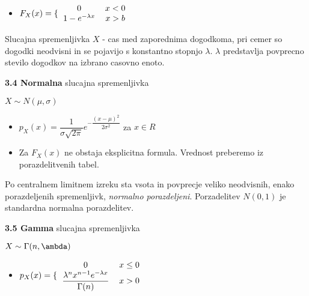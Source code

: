 \documentclass{article}
\begin{document}
\begin{multicols}{3}
\begin{itemize}
		\item \begin{math}
			      F_{X}(x) =
			      \{\begin{tabular}{ccc}
				      $0$                   & $x < 0$ & \\
				      $1 - e^{- \lambda x}$ & $x > b$ & \\
			      \end{tabular}
		      \end{math}
	\end{itemize}

	Slucajna spremenljivka $X$ - cas med zaporednima dogodkoma,
	pri cemer so dogodki neodvisni in se pojavijo s konstantno
	stopnjo $\lambda$. $\lambda$ predstavlja povprecno stevilo dogodkov
	na izbrano casovno enoto.

	\textbf{3.4 Normalna} slucajna spremenljivka
	\begin{center}
		\begin{math}
			X \sim N(\mu, \sigma )
		\end{math}
	\end{center}

	\begin{itemize}
		\item  \begin{math}
			      p_{X}(x) = \dfrac{1}{\sigma \sqrt{2 \pi}} e^{- \dfrac{(x - \mu)^{2}}{2 \sigma^{2}}}
		      \end{math} za $x \in R$

		\item Za $F_{X}(x)$ ne obstaja eksplicitna formula. Vrednost preberemo iz porazdelitvenih tabel.
	\end{itemize}
	Po centralnem limitnem izreku sta vsota in povprecje veliko neodvisnih, enako porazdeljenih
	spremenljivk, \textit{normalno porazdeljeni}.
	Porzadelitev $N(0, 1)$ je standardna normalna porazdelitev.

	\textbf{3.5 Gamma} slucajna spremenljivka
	\begin{center}
		\begin{math}
			X \sim \Gamma(n, \ambda)
		\end{math}
	\end{center}

	\begin{itemize}
		\item  \begin{math}
			      p_{X}(x) =
			      \{\begin{tabular}{ccc}
				      $0$                                                        & $x \leq 0$ & \\
				      $\dfrac{\lambda^{n} x^{n- 1} e^{ - \lambda x}}{\Gamma(n)}$ & $x > 0$    & \\
			      \end{tabular}
		      \end{math}
	\end{itemize}


\end{multicols}
\end{document}
